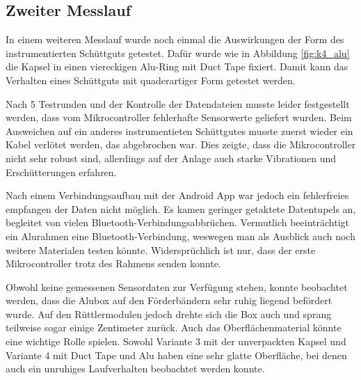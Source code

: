 
\subsection{Zweiter Messlauf}

In einem weiteren Messlauf wurde noch einmal die Auswirkungen der Form des instrumentierten Schüttguts getestet. Dafür wurde wie in Abbildung \ref{fig:k4_alu} die Kapsel in einen viereckigen Alu-Ring  mit Duct Tape fixiert. Damit kann das Verhalten eines Schüttguts mit quaderartiger Form getestet werden. 


Nach 5 Testrunden und der Kontrolle der Datendateien musste leider festgestellt werden, dass vom Mikrocontroller fehlerhafte Sensorwerte geliefert wurden. Beim Ausweichen auf ein anderes instrumentieten Schüttgutes musste zuerst wieder ein Kabel verlötet werden, das abgebrochen war. Dies zeigte, dass die Mikrocontroller nicht sehr robust sind, allerdings auf der Anlage auch starke Vibrationen und Erschütterungen erfahren.

Nach einem Verbindungsaufbau mit der Android App war jedoch ein fehlerfreies empfangen der Daten nicht möglich. Es kamen geringer getaktete Datentupels an, begleitet von vielen Bluetooth-Verbindungsabbrüchen. Vermutlich beeinträchtigt ein Alurahmen eine Bluetooth-Verbindung, weswegen man als Ausblick auch noch weitere Materialen testen könnte. Widersprüchlich ist nur, dass der erste Mikrocontroller trotz des Rahmens senden konnte. 

Obwohl keine gemessenen Sensordaten zur Verfügung stehen, konnte beobachtet werden, dass die Alubox auf den Förderbändern sehr ruhig liegend befördert wurde. Auf den Rüttlermodulen jedoch drehte sich die Box auch und sprang teilweise sogar einige Zentimeter zurück. Auch das Oberflächenmaterial könnte eine wichtige Rolle spielen. Sowohl Variante 3 mit der unverpackten Kapsel und Variante 4 mit Duct Tape und Alu haben eine sehr glatte Oberfläche, bei denen auch ein unruhiges Laufverhalten beobachtet werden konnte.

